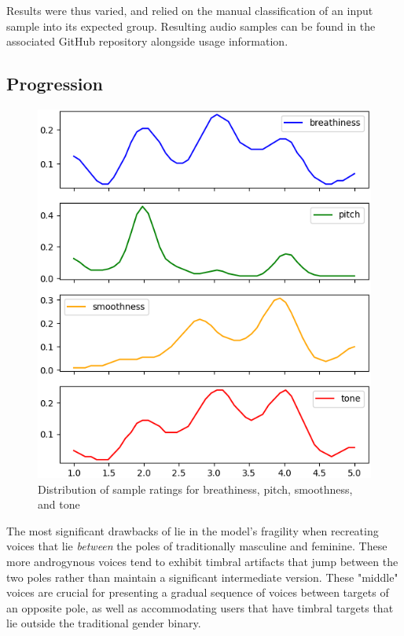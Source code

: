 \documentclass{article}
\begin{document}
Results were thus varied, and relied on the manual classification of an input sample into its expected group. Resulting audio samples can be found in the associated GitHub repository \cite{github} alongside usage information.


\subsection{Progression}

\begin{figure}
    \centering
    \includegraphics[width=0.9\linewidth]{distributions.png}
    \caption{Distribution of sample ratings for breathiness, pitch, smoothness, and tone}
    \label{fig:distributions}
\end{figure}

The most significant drawbacks of \cite{doyle2025} lie in the model's fragility when recreating voices that lie \textit{between} the poles of traditionally masculine and feminine. These more androgynous voices tend to exhibit timbral artifacts that jump between the two poles rather than maintain a significant intermediate version. These "middle" voices are crucial for presenting a gradual sequence of voices between targets of an opposite pole, as well as accommodating users that have timbral targets that lie outside the traditional gender binary.
\end{document}
